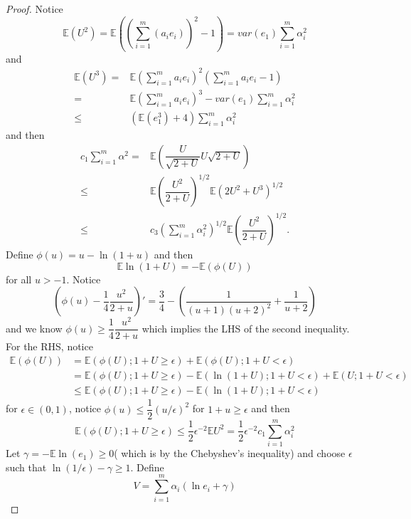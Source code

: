 \begin{proof}
    Notice
    \[
    \mathbb{E}(U^2) = \mathbb{E}((\sum\limits_{i=1}^m(a_ie_i))^2 - 1) =var(e_1)\sum\limits_{i=1}^m \alpha_i^2
    \]
    and
    \[
    \begin{aligned}
        \mathbb{E}(U^3)=& \mathbb{E}(\sum\limits_{i=1}^m a_ie_i)^2(\sum\limits_{i=1}^m a_ie_i-1) \\ =& \mathbb{E}(\sum\limits_{i=1}^m a_ie_i)^3 - var(e_1)\sum\limits_{i=1}^m \alpha_i^2\\
        \leq& (\mathbb{E}(e_1^3)+4)\sum\limits_{i=1}^m \alpha_i^2
    \end{aligned}
    \]
    and then
    \[
    \begin{aligned}
        c_1\sum\limits_{i=1}^m \alpha^2 =& \mathbb{E}\left(\dfrac{U}{\sqrt{2+U}}U\sqrt{2+U}\right) \\
        \leq& \mathbb{E}\left(\dfrac{U^2}{2+U}\right)^{1/2}\mathbb{E}(2U^2+U^3)^{1/2}\\
        \leq& c_3\left(\sum\limits_{i=1}^m \alpha_i^2\right)^{1/2}\mathbb{E}\left(\dfrac{U^2}{2+U}\right)^{1/2}.
    \end{aligned}
    \]
    Define $\phi(u) = u - \ln(1+u)$ and then
    \[\mathbb{E}\ln(1+U) = - \mathbb{E}(\phi(U))\]
    for all $u>-1$. Notice
    \[
    \left(\phi(u) - \dfrac{1}{4}\dfrac{u^2}{2+u}\right)' = \dfrac{3}{4} - \left(\dfrac{1}{(u+1)(u+2)^2} + \dfrac{1}{u+2}\right)
    \] and we know $\phi(u) \geq \dfrac{1}{4}\dfrac{u^2}{2+u}$ which implies the LHS of the second inequality. For the RHS, notice
    \[
    \begin{aligned}
        \mathbb{E}(\phi(U)) &= \mathbb{E}(\phi(U); 1+U\geq \epsilon) + \mathbb{E}(\phi(U); 1+U < \epsilon) \\
        &= \mathbb{E}(\phi(U); 1+U\geq \epsilon) - \mathbb{E}(\ln(1+U); 1+U < \epsilon) + \mathbb{E}(U;1+U < \epsilon) \\
        &\leq\mathbb{E}(\phi(U); 1+U\geq \epsilon) - \mathbb{E}(\ln(1+U); 1+U < \epsilon)
    \end{aligned}
    \]
    for $\epsilon \in (0,1)$, notice $\phi(u) \leq \dfrac{1}{2}(u/\epsilon)^2$ for $1+u \geq \epsilon$ and then
    \[
    \mathbb{E}(\phi(U); 1+U\geq\epsilon) \leq \dfrac{1}{2}\epsilon^{-2}\mathbb{E}U^2 = \dfrac{1}{2}\epsilon^{-2}c_1\sum\limits_{i=1}^m \alpha_i^2
    \]
    Let $\gamma = -\mathbb{E}\ln(e_1) \geq 0$( which is by the Chebyshev's inequality) and choose $\epsilon$ such that $\ln(1/\epsilon) - \gamma \geq 1$. Define
    \[
    V = \sum\limits_{i=1}^m \alpha_i(\ln e_i + \gamma)
\]
\end{proof}
